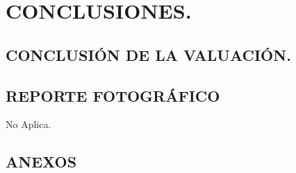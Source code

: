 \documentclass[10pt,letter]{report}
\begin{document}
\espacio{7cm}
\chapter{CONCLUSIONES.}\label{cap:6}
\thispagestyle{fancy}
\setcounter{section}{16}
\section{CONCLUSI\'ON DE LA VALUACI\'ON.}\label{sec:p}




\section{REPORTE FOTOGR\'AFICO}\label{sec:q}
No Aplica.
\section{ANEXOS}\label{sec:r}

\newpage


\label{lastpage}
\end{document}
